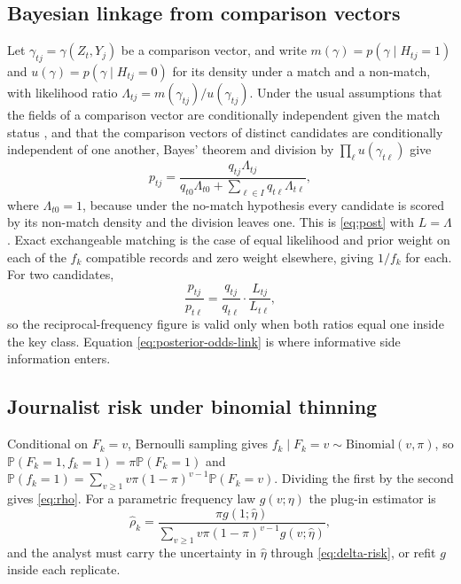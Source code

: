 \documentclass[11pt,a4paper]{article}
\theoremstyle{plain}
\theoremstyle{definition}
\newcommand{\Prob}{\mathbb{P}}
\begin{document}
\subsection{Bayesian linkage from comparison vectors}

Let $\gamma_{tj}=\gamma(Z_t,Y_j)$ be a comparison vector, and write
$m(\gamma)=p(\gamma\mid H_{tj}=1)$ and $u(\gamma)=p(\gamma\mid H_{tj}=0)$ for its
density under a match and a non-match, with likelihood ratio
$\Lambda_{tj}=m(\gamma_{tj})/u(\gamma_{tj})$. Under the usual assumptions that the fields of a comparison vector are
conditionally independent given the match status \citep{fellegi1969}, and that the
comparison vectors of distinct candidates are conditionally independent of one
another, Bayes' theorem and division by $\prod_\ell u(\gamma_{t\ell})$ give
\begin{equation}
p_{tj}=\frac{q_{tj}\Lambda_{tj}}
 {q_{t0}\Lambda_{t0}+\sum_{\ell\in I}q_{t\ell}\Lambda_{t\ell}},
\end{equation}
where $\Lambda_{t0}=1$, because under the no-match hypothesis every candidate is
scored by its non-match density and the division leaves one. This is
\eqref{eq:post} with $L=\Lambda$. Exact exchangeable matching is the case
of equal likelihood and prior weight on each of the $f_k$ compatible records and
zero weight elsewhere, giving $1/f_k$ for each. For two candidates,
\begin{equation}
\frac{p_{tj}}{p_{t\ell}}
=\frac{q_{tj}}{q_{t\ell}}\cdot\frac{L_{tj}}{L_{t\ell}} ,
\label{eq:posterior-odds-link}
\end{equation}
so the reciprocal-frequency figure is valid only when both ratios equal one inside
the key class. Equation \eqref{eq:posterior-odds-link} is where informative side
information enters.

\subsection{Journalist risk under binomial thinning}

Conditional on $F_k=v$, Bernoulli sampling gives $f_k\mid F_k=v\sim
\mathrm{Binomial}(v,\pi)$, so $\Prob(F_k=1,f_k=1)=\pi\Prob(F_k=1)$ and
$\Prob(f_k=1)=\sum_{v\ge1}v\pi(1-\pi)^{v-1}\Prob(F_k=v)$. Dividing the first by
the second gives \eqref{eq:rho}. For a parametric frequency law $g(v;\eta)$ the
plug-in estimator is
\begin{equation}
\widehat\rho_k=
\frac{\pi g(1;\widehat\eta)}
 {\sum_{v\ge1}v\pi(1-\pi)^{v-1}g(v;\widehat\eta)} ,
\end{equation}
and the analyst must carry the uncertainty in $\widehat\eta$ through
\eqref{eq:delta-risk}, or refit $g$ inside each replicate.
\end{document}
